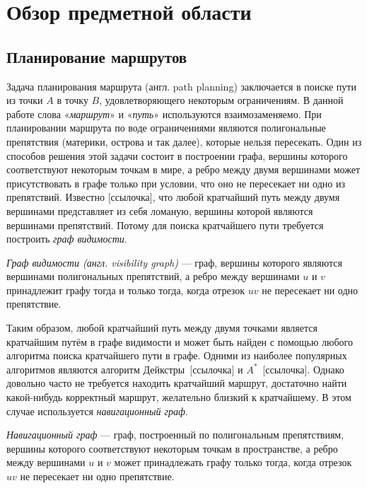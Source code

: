 \chapter{Обзор предметной области}

\section{Планирование маршрутов}

Задача планирования маршрута (англ. path planning) заключается в
поиске пути из точки $A$ в точку $B$, удовлетворяющего некоторым
ограничениям. В данной работе слова «\emph{маршрут}» и «\emph{путь}»
используются взаимозаменяемо. При планировании маршрута по воде
ограничениями являются полигональные препятствия (материки, острова и
так далее), которые нельзя пересекать. Один из способов решения этой
задачи состоит в построении графа, вершины которого соответствуют
некоторым точкам в мире, а ребро между двумя вершинами может
присутствовать в графе только при условии, что оно не пересекает ни
одно из препятствий. Известно [ссылочка], что любой кратчайший путь
между двумя вершинами представляет из себя ломаную, вершины которой
являются вершинами препятствий. Потому для поиска кратчайшего пути
требуется построить \emph{граф видимости}.

\emph{Граф видимости (англ. visibility graph)} --- граф, вершины
которого являются вершинами полигональных препятствий, а ребро между
вершинами $u$ и $v$ принадлежит графу тогда и только тогда, когда
отрезок $uv$ не пересекает ни одно препятствие.

Таким образом, любой кратчайший путь между двумя точками является
кратчайшим путём в графе видимости и может быть найден с помощью
любого алгоритма поиска кратчайшего пути в графе. Одними из наиболее
популярных алгоритмов являются алгоритм Дейкстры~[ссылочка] и
$A^*$~[ссылочка]. Однако довольно часто не требуется находить
кратчайший маршрут, достаточно найти какой-нибудь корректный маршрут,
желательно близкий к кратчайшему. В этом случае используется
\emph{навигационный граф}.

\emph{Навигационный граф} --- граф, построенный по полигональным
препятствиям, вершины которого соответствуют некоторым точкам в
пространстве, а ребро между вершинами $u$ и $v$ может принадлежать
графу только тогда, когда отрезок $uv$ не пересекает ни одно
препятствие.

